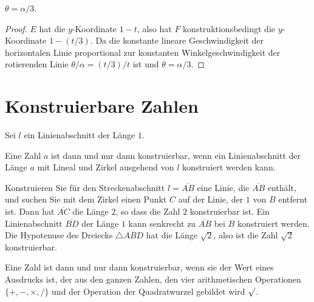 \begin{theorem}
$\theta = \alpha/3$.
\end{theorem}
\begin{proof}
$E$ hat die $y$-Koordinate $1-t$, also hat $F$ konstruktionsbedingt die $y$-Koordinate $1-(t/3)$. Da die konstante lineare Geschwindigkeit der horizontalen Linie proportional zur konstanten Winkelgeschwindigkeit der rotierenden Linie $\theta/\alpha = (t/3)/t$ ist und $\theta = \alpha/3$.
\end{proof}

\section{Konstruierbare Zahlen}\label{s.trisect-constructible}


Sei $l$ ein Linienabschnitt der Länge $1$.

\begin{definition}
Eine Zahl $a$ ist dann und nur dann konstruierbar, wenn ein Linienabschnitt der Länge $a$ mit Lineal und Zirkel ausgehend von $l$ konstruiert werden kann.
\end{definition}

Konstruieren Sie für den Streckenabschnitt $l=\overline{AB}$ eine Linie, die $\overline{AB}$ enthält, und suchen Sie mit dem Zirkel einen Punkt $C$ auf der Linie, der $1$ von $B$ entfernt ist. Dann hat $\overline{AC}$ die Länge $2$, so dass die Zahl $2$ konstruierbar ist. Ein Linienabschnitt $\overline{BD}$ der Länge $1$ kann senkrecht zu $\overline{AB}$ bei $B$ konstruiert werden. Die Hypotenuse des Dreiecks $\triangle ABD$ hat die Länge $\sqrt{2}$, also ist die Zahl $\sqrt{2}$ konstruierbar.

\begin{theorem}\label{thm.trisect-constructible}
Eine Zahl ist dann und nur dann konstruierbar, wenn sie der Wert eines Ausdrucks ist, der aus den ganzen Zahlen, den vier arithmetischen Operationen $\{+,-,\times,/\}$ und der Operation der Quadratwurzel gebildet wird $\surd$.
\end{theorem}

